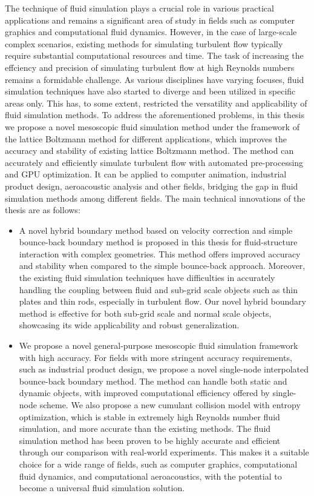 \begin{abstract*}[flattitle]
  The technique of fluid simulation plays a crucial role in various practical applications and remains a significant area of study in fields such as computer graphics and computational fluid dynamics. However, in the case of large-scale complex scenarios, existing methods for simulating turbulent flow typically require substantial computational resources and time. The task of increasing the effciency and precision of simulating turbulent flow at high Reynolds numbers remains a formidable challenge. As various disciplines have varying focuses, fluid simulation techniques have also started to diverge and been utilized in specific areas only. This has, to some extent, restricted the versatility and applicability of fluid simulation methods. To address the aforementioned problems, in this thesis we propose a novel mesoscopic fluid simulation method under the framework of the lattice Boltzmann method for different applications, which improves the accuracy and stability of existing lattice Boltzmann method. The method can accurately and efficiently simulate turbulent flow with automated pre-processing and GPU optimization. It can be applied to computer animation, industrial product design, aeroacoustic analysis and other fields, bridging the gap in fluid simulation methods among different fields. The main technical innovations of the thesis are as follows:
  \begin{itemize}
    \item A novel hybrid boundary method based on velocity correction and simple bounce-back boundary method is proposed in this thesis for fluid-structure interaction with complex geometries. This method offers improved accuracy and stability when compared to the simple bounce-back approach. Moreover, the existing fluid simulation techniques have difficulties in accurately handling the coupling between fluid and sub-grid scale objects such as thin plates and thin rods, especially in turbulent flow. Our novel hybrid boundary method is effective for both sub-grid scale and normal scale objects, showcasing its wide applicability and robust generalization.
    \item We propose a novel general-purpose mesoscopic fluid simulation framework with high accuracy. For fields with more stringent accuracy requirements, such as industrial product design, we propose a novel single-node interpolated bounce-back boundary method. The method can handle both static and dynamic objects, with improved computational efficiency offered by single-node scheme. We also propose a new cumulant collision model with entropy optimization, which is stable in extremely high Reynolds number fluid simulation, and more accurate than the existing methods. The fluid simulation method has been proven to be highly accurate and efficient through our comparison with real-world experiments. This makes it a suitable choice for a wide range of fields, such as computer graphics, computational fluid dynamics, and computational aeroacoustics, with the potential to become a universal fluid simulation solution.

\end{itemize}
\end{abstract*}
